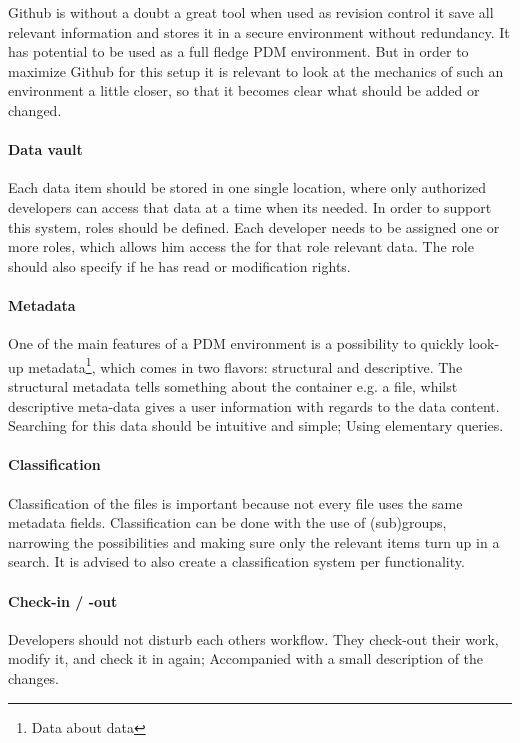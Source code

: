 \documentclass[fleqn,10pt]{SelfArx} %
\begin{document}
Github is without a doubt a great tool when used as revision control it save all relevant information and stores it in a secure environment without redundancy. It has potential to be used as a full fledge PDM environment. But in order to maximize Github for this setup it is relevant to look at the mechanics of such an environment a little closer, so that it becomes clear what should be added or changed.

\paragraph{Data vault}
Each data item should be stored in one single location, where only authorized developers can access that data at a time when its needed. In order to support this system, roles should be defined. Each developer needs to be assigned one or more roles, which allows him access the for that role relevant data. The role should also specify if he has read or modification rights.

\paragraph{Metadata}
One of the main features of a PDM environment is a possibility to quickly look-up metadata\footnote{Data about data}, which comes in two flavors: structural and descriptive. The structural metadata tells something about the container e.g. a file, whilst descriptive meta-data gives a user information with regards to the data content. Searching for this data should be intuitive and simple; Using elementary queries.

\paragraph{Classification}
Classification of the files is important because not every file uses the same metadata fields. Classification can be done with the use of (sub)groups, narrowing the possibilities and making sure only the relevant items turn up in a search. It is advised to also create a classification system per functionality.

\paragraph{Check-in / -out}
Developers should not disturb each others workflow. They check-out their work, modify it, and check it in again; Accompanied with a small description of the changes.
\end{document}
